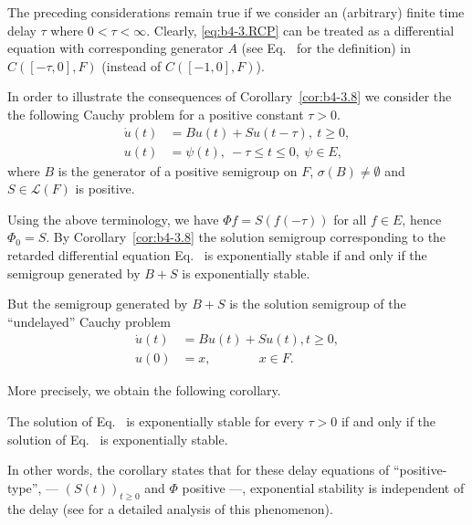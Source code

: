 The preceding considerations remain true if we consider an (arbitrary) finite time delay $\tau$ where $0 < \tau < \infty$. 
Clearly, \eqref{eq:b4-3.RCP} can be treated as a differential equation with corresponding generator $A$ (see Eq.~ for the definition) in $C([-\tau,0],F)$ (instead of\/ $C([-1,0],F)$).
\begin{example}\label{ex:b4-3.10}
	In order to illustrate the consequences of Corollary~\ref{cor:b4-3.8} we consider the the following Cauchy problem for a positive constant  $\tau > 0$.
	\begin{equation}\label{eq:b4-3.7}
		\begin{aligned}
		\dot{u}(t) &= Bu(t) + Su(t-\tau) , \  t \geq 0 ,\\
		u(t) &= \psi(t) , \  -\tau \leq t \leq 0  , \ \psi \in E ,
		\end{aligned}
	\end{equation}
	where $B$ is the generator of a positive semigroup on $F$, $\sigma(B) \neq \emptyset$ and $S \in \mathcal{L}(F)$ is positive.
	
	Using the above terminology, we have $\Phi f = S(f(-\tau))$ for all $f \in E$, hence $\Phi_{0} = S$. 
	By Corollary~\ref{cor:b4-3.8} the solution semigroup corresponding to the retarded differential equation Eq.~ is exponentially stable if and only if the semigroup generated by $B + S$ is exponentially stable.
	
	But the semigroup generated by $B + S$ is the solution semigroup of the \enquote{undelayed} Cauchy problem
	\begin{equation}\label{eq:b4-3.8}
	\begin{aligned}
		\dot{u}(t) &= Bu(t) + Su(t) , t \geq 0 ,\\
		u(0) &= x , \quad\quad\quad\;\;\, x \in F.
	\end{aligned}
	\end{equation}
\end{example}
More precisely, we obtain the following corollary.
\begin{corollary*}
    The solution of Eq.~ is exponentially stable for every $\tau > 0$ if and only if the solution of Eq.~ is exponentially stable.
\end{corollary*}
In other words, the corollary states that for these delay equations of \enquote{positive-type}, 
--- $(S(t))_{t\geq0}$ and $\Phi$ positive ---, 
exponential stability is independent of the delay (see \textcite{kerscher:1986} for a detailed analysis of this phenomenon).
	
